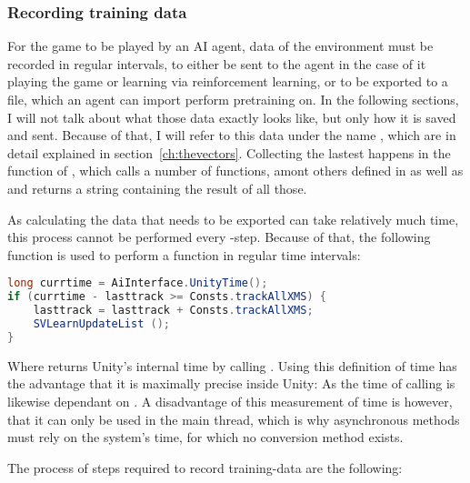 \subsubsection{Recording training data}

For the game to be played by an AI agent, data of the environment must be recorded in regular intervals, to either be sent to the agent in the case of it playing the game or learning via reinforcement learning, or to be exported to a file, which an agent can import perform pretraining on. In the following sections, I will not talk about what those data exactly looks like, but only how it is saved and sent. Because of that, I will refer to this data under the name , which are in detail explained in section~\ref{ch:thevectors}. Collecting the lastest  happens in the function  of , which calls a number of functions, amont others defined in  as well as  and returns a string containing the result of all those.

As calculating the data that needs to be exported can take relatively much time, this process cannot be performed every -step. Because of that, the following function is used to perform a function in regular time intervals:
\begin{lstlisting}[language=C#, style=CSharp, frame=none]
long currtime = AiInterface.UnityTime();
if (currtime - lasttrack >= Consts.trackAllXMS) {
	lasttrack = lasttrack + Consts.trackAllXMS; 
	SVLearnUpdateList ();
}
\end{lstlisting}%

Where  returns Unity's internal time by calling . Using this definition of time has the advantage that it is maximally precise inside Unity: As the time of calling  is likewise dependant on . A disadvantage of this measurement of time is however, that it can only be used in the main thread, which is why asynchronous methods must rely on the system's time, for which no conversion method exists.

The process of steps required to record training-data are the following:

